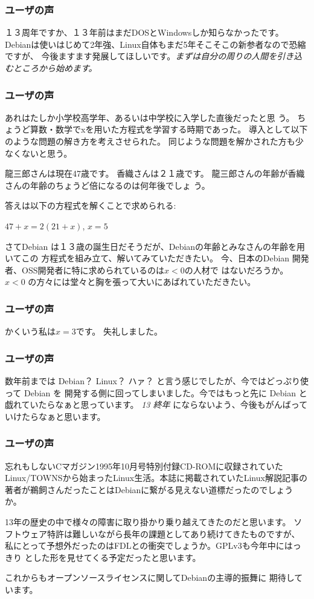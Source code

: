 \documentclass[cjk,dvipdfmx]{beamer}
\begin{document}
\begin{frame}
 \frametitle{ユーザの声}
１３周年ですか、１３年前はまだDOSとWindowsしか知らなかったです。
Debianは使いはじめて2年強、Linux自体もまだ5年そこそこの新参者なので恐縮ですが、
今後ますます発展してほしいです。{\em まずは自分の周りの人間を引き込むところから始めます。}
\end{frame}

\begin{frame}
 \frametitle{ユーザの声}
あれはたしか小学校高学年、あるいは中学校に入学した直後だったと思
う。
ちょうど算数・数学でxを用いた方程式を学習する時期であった。
導入として以下のような問題の解き方を考えさせられた。
同じような問題を解かされた方も少なくないと思う。

龍三郎さんは現在47歳です。
香織さんは２１歳です。
龍三郎さんの年齢が香織さんの年齢のちょうど倍になるのは何年後でしょ
う。

答えは以下の方程式を解くことで求められる:

$47+x=2(21+x)$, 
$x=5$

さてDebian は１３歳の誕生日だそうだが、Debianの年齢とみなさんの年齢を用いてこの
方程式を組み立て、解いてみていただきたい。
今、日本のDebian 開発者、OSS開発者に特に求められているのは$x<0$の人材で
はないだろうか。
$x<0$ の方々には堂々と胸を張って大いにあばれていただきたい。
\end{frame}

\begin{frame}
 \frametitle{ユーザの声}
かくいう私は$x=3$です。
失礼しました。
\end{frame}

\begin{frame}
 \frametitle{ユーザの声}
数年前までは Debian？ Linux？ ハァ？ と言う感じでしたが、今ではどっぷり使って Debian を
開発する側に回ってしまいました。今ではもっと先に Debian と戯れていたらなぁと思っています。
{\em 13 終年} にならないよう、今後もがんばっていけたらなぁと思います。
\end{frame}

\begin{frame}
 \frametitle{ユーザの声}
忘れもしないCマガジン1995年10月号特別付録CD-ROMに収録されていた
Linux/TOWNSから始まったLinux生活。本誌に掲載されていたLinux解説記事の
著者が鵜飼さんだったことはDebianに繋がる見えない道標だったのでしょうか。

13年の歴史の中で様々の障害に取り掛かり乗り越えてきたのだと思います。
ソフトウェア特許は難しいながら長年の課題としてあり続けてきたものですが、
私にとって予想外だったのはFDLとの衝突でしょうか。GPLv3も今年中にはっきり
とした形を見せてくる予定だったと思います。

これからもオープンソースライセンスに関してDebianの主導的振舞に
期待しています。
\end{frame}
\end{document}
